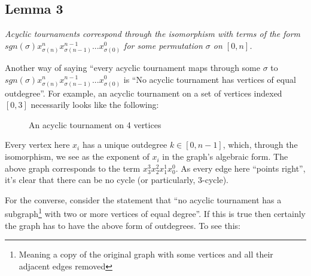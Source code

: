 \documentclass[11pt, oneside]{article} 	%
\begin{document}
\subsection{Lemma 3}

\emph{Acyclic tournaments correspond through the isomorphism with terms of the form $sgn(\sigma) x_{\sigma(n)}^nx_{\sigma(n-1)}^{n-1}  ... x_{\sigma(0)}^{0}$ for some permutation $\sigma$ on $[0,n]$.}


Another way of saying ``every acyclic tournament maps through some $\sigma$ to$sgn(\sigma) x_{\sigma(n)}^nx_{\sigma(n-1)}^{n-1}  ... x_{\sigma(0)}^{0}$ is ``No acyclic tournament has vertices of equal outdegree''.  For example, an acyclic tournament on a set of vertices indexed $[0, 3]$ necessarily looks like the following:

\begin{figure}
\caption{An acyclic tournament on 4 vertices}
\label{fig:test2}
\end{figure}


Every vertex here $x_i$ has a unique outdegree $k \in [0,n-1]$, which, through the isomorphism, we see as the exponent of $x_i$ in the graph's algebraic form.  The above graph corresponds to the term $x_3^3x_2^2x_1^1x_0^0$.  As every edge here ``points right'', it's clear that there can be no cycle (or particularly, 3-cycle).

For the converse, consider the statement that ``no acyclic tournament has a subgraph\footnote{Meaning a copy of the original graph with some vertices and all their adjacent edges removed} with two or more vertices of equal degree''.  If this is true then certainly the graph has to have the above form of outdegrees.  To see this:
\end{document}
